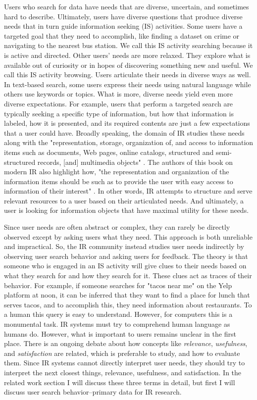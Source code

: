 Users who search for data have needs that are diverse, uncertain, and sometimes hard to describe. Ultimately, users have diverse questions that produce diverse needs that in turn guide information seeking (IS) activities. Some users have a targeted goal that they need to accomplish, like finding a dataset on crime or navigating to the nearest bus station. We call this IS activity searching because it is active and directed. Other users' needs are more relaxed. They explore what is available out of curiosity or in hopes of discovering something new and useful. We call this IS activity browsing. Users articulate their needs in diverse ways as well. In text-based search, some users express their needs using natural language while others use keywords or topics. What is more, diverse needs yield even more diverse expectations. For example, users that perform a targeted search are typically seeking a specific type of information, but how that information is labeled, how it is presented, and its required contents are just a few expectations that a user could have. Broadly speaking, the domain of IR studies these needs along with the "representation, storage, organization of, and access to information items such as documents, Web pages, online catalogs, structured and semi-structured records, [and] multimedia objects" \cite{Baeza-Yates1999}. The authors of this book on modern IR also highlight how, "the representation and organization of the information items should be such as to provide the user with easy access to information of their interest" \cite{Baeza-Yates1999}. In other words, IR attempts to structure and serve relevant resources to a user based on their articulated needs. And ultimately, a user is looking for information objects that have maximal utility for these needs.

Since user needs are often abstract or complex, they can rarely be directly observed except by asking users what they need. This approach is both unreliable and impractical. So, the IR community instead studies user needs indirectly by observing user search behavior and asking users for feedback. The theory is that someone who is engaged in an IS activity will give clues to their needs based on what they search for and how they search for it. These clues act as traces of their behavior. For example, if someone searches for "tacos near me" on the Yelp platform at noon, it can be inferred that they want to find a place for lunch that serves tacos, and to accomplish this, they need information about restaurants. To a human this query is easy to understand. However, for computers this is a monumental task. IR systems must try to comprehend human language as humans do. However, what is important to users remains unclear in the first place. There is an ongoing debate about how concepts like \emph{relevance}, \emph{usefulness}, and \emph{satisfaction} are related, which is preferable to study, and how to evaluate them. Since IR systems cannot directly interpret user needs, they should try to interpret the next closest things, relevance, usefulness, and satisfaction. In the related work section I will discuss these three terms in detail, but first I will discuss user search behavior–primary data for IR research.

